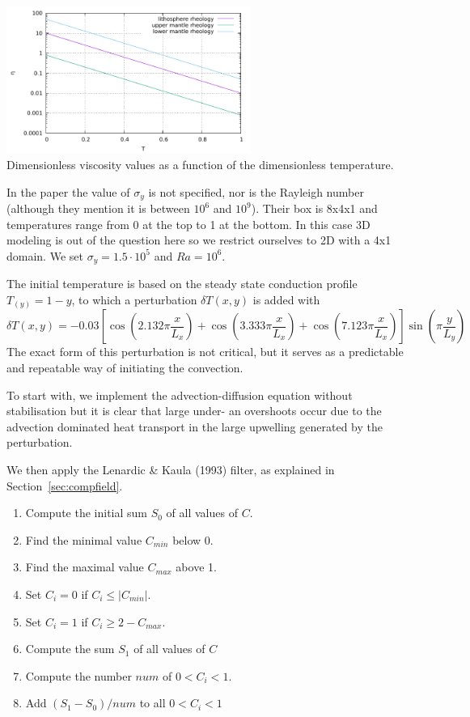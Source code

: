 \begin{center}
\includegraphics[width=8cm]{python_codes/fieldstone_88/images/visc.pdf}\\
{\captionfont Dimensionless viscosity values as a function of the dimensionless temperature.}
\end{center}

In the paper the value of $\sigma_y$ is not specified, nor is the Rayleigh number (although 
they mention it is between $10^6$ and $10^9$).
Their box is 8x4x1 and temperatures range from 0 at the top to 1 at the bottom.
In this case 3D modeling is out of the question here so we restrict ourselves to 2D with a 4x1 domain. 
We set $\sigma_y=1.5\cdot 10^5$ and $Ra=10^6$.

The initial temperature is based on the steady state conduction profile $T_(y)=1-y$, to which a
perturbation $\delta T(x,y)$ is added with 
\[
\delta T(x,y) = -0.03 \left[ \cos\left(2.132\pi \frac{x}{L_x}\right)
+ \cos\left(3.333\pi  \frac{x}{L_x}\right)
+ \cos\left(7.123 \pi  \frac{x}{L_x} \right) \right] \sin \left(\pi  \frac{y}{L_y} \right)
\]
The exact form of this perturbation is not critical, but it serves as a predictable and repeatable way of 
initiating the convection.

To start with, we implement the advection-diffusion equation without stabilisation but it is clear that 
large under- an overshoots occur due to the advection dominated heat transport in the large upwelling 
generated by the perturbation.

We then apply the Lenardic \& Kaula (1993) \cite{leka93} filter, as explained in Section~\ref{sec:compfield}.
\begin{enumerate}
\item Compute the initial sum $S_0$ of all values of $C$.
\item Find the minimal value $C_{min}$ below 0.
\item Find the maximal value $C_{max}$ above 1.
\item Set $C_i=0$ if $C_i \leq |C_{min}|$.
\item Set $C_i=1$ if $C_i \geq 2-C_{max}$. 
\item Compute the sum $S_1$ of all values of $C$
\item Compute the number $num$ of $0 < C_i < 1$.
\item Add $(S_1-S_0)/num$ to all $0<C_i<1$
\end{enumerate}

